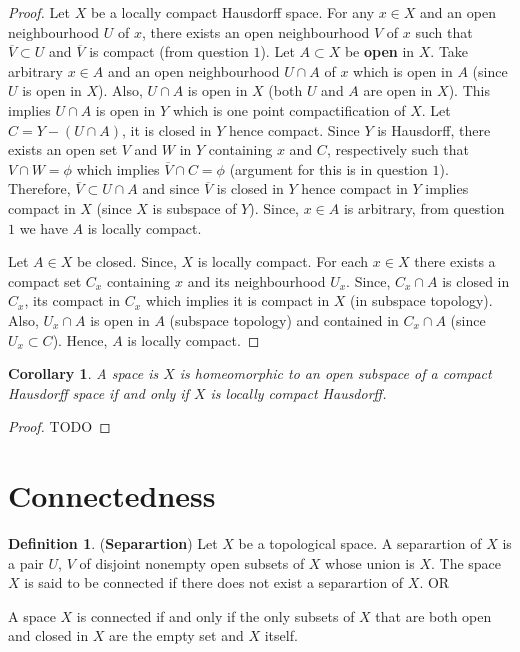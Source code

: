 \documentclass[12pt,reqno]{amsart}
\theoremstyle{plain}
\newtheorem{cor}{Corollary}
\theoremstyle{definition}
\newtheorem{defn}{Definition}
\begin{document}
\begin{proof}
    Let $X$ be a locally compact Hausdorff space. For any $x \in X$ and an open neighbourhood $U$ of $x$, there exists an open neighbourhood $V$ of $x$ such that $\overline{V} \subset U$ and $\overline{V}$ is compact (from question $1$). Let $A \subset X$ be {\bf open} in $X$. Take arbitrary $x \in A$ and an open neighbourhood $U \cap A$ of $x$ which is open in $A$ (since $U$ is open in $X$). Also, $U \cap A$ is open in $X$ (both $U$ and $A$ are open in $X$). This implies $U \cap A$ is open in $Y$ which is one point compactification of $X$. Let $C = Y - (U \cap A)$, it is closed in $Y$ hence compact. Since $Y$ is Hausdorff, there exists an open set $V$ and $W$ in $Y$ containing $x$ and $C$, respectively such that $V \cap W = \phi$ which implies $\overline{V} \cap C = \phi$ (argument for this is in question $1$). Therefore, $\overline{V} \subset U \cap A$ and since $\overline{V}$ is closed in $Y$ hence compact in $Y$ implies compact in $X$ (since $X$ is subspace of $Y$). Since, $x \in A$ is arbitrary, from question $1$ we have $A$ is locally compact.

    Let $A \in X$ be closed. Since, $X$ is locally compact. For each $x \in X$ there exists a compact set $C_x$ containing $x$ and its neighbourhood $U_x$. Since, $C_x \cap A$ is closed in $C_x$, its compact in $C_x$ which implies it is compact in $X$ (in subspace topology). Also, $U_x \cap A$ is open in $A$ (subspace topology) and contained in $C_x \cap A$ (since $U_x \subset C$). Hence, $A$ is locally compact.
\end{proof}

\begin{cor}
    A space is $X$ is homeomorphic to an open subspace of a compact Hausdorff space if and only if $X$ is locally compact Hausdorff.
\end{cor}
\begin{proof}
    TODO
\end{proof}

\section{Connectedness}
\begin{defn}({\bf Separartion})
    Let $X$ be a topological space. A separartion of $X$ is a pair $U$, $V$ of disjoint nonempty open subsets of $X$ whose union is $X$. The space $X$ is said to be connected if there does not exist a separartion of $X$. OR

    A space $X$ is connected if and only if the only subsets of $X$ that are both open and closed in $X$ are the empty set and $X$ itself.
\end{defn}
\end{document}
